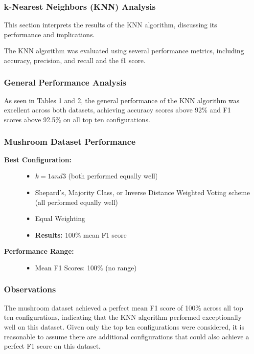\subsubsection{k-Nearest Neighbors (KNN) Analysis}
\label{subsubsec:discussion-knn}

This section interprets the results of the KNN algorithm, discussing its performance and implications.

The KNN algorithm was evaluated using several performance metrics, including accuracy, precision, and recall and the f1 score.

\subsubsection*{General Performance Analysis}
As seen in Tables 1 and 2, the general performance of the KNN algorithm was excellent across both datasets,
achieving accuracy scores above 92\% and F1 scores above 92.5\% on all top ten configurations.

\subsubsection{Mushroom Dataset Performance}

\begin{description}
    \item[\textbf{Best Configuration:}]\leavevmode
        \begin{itemize}
            \item $k = 1 and 3$ (both performed equally well)
            \item Shepard's, Majority Class, or Inverse Distance Weighted Voting scheme (all performed equally well)
            \item Equal Weighting
            \item \textbf{Results:} 100\% mean F1 score
        \end{itemize}
    
    \item[\textbf{Performance Range:}]\leavevmode
        \begin{itemize}
            \item Mean F1 Scores: 100\% (no range)
        \end{itemize}
\end{description}

\subsubsection*{Observations}
The mushroom dataset achieved a perfect mean F1 score of 100\% across all top ten configurations,
indicating that the KNN algorithm performed exceptionally well on this dataset.
Given only the top ten configurations were considered, it is reasonable to assume there are additional
configurations that could also achieve a perfect F1 score on this dataset.

